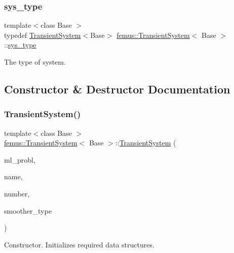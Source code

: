 \subsubsection{\texorpdfstring{sys\+\_\+type}{sys\_type}}
{\footnotesize\ttfamily template$<$class Base $>$ \\
typedef \mbox{\hyperlink{classfemus_1_1_transient_system}{Transient\+System}}$<$Base$>$ \mbox{\hyperlink{classfemus_1_1_transient_system}{femus\+::\+Transient\+System}}$<$ Base $>$\+::\mbox{\hyperlink{classfemus_1_1_transient_system_ab305e3c2b57ea9f93730f7fc712b6403}{sys\+\_\+type}}}

The type of system. 

\subsection{Constructor \& Destructor Documentation}
\mbox{\label{classfemus_1_1_transient_system_ab3db35bb6c3a8c97a88d4e8ad9461537}} 
\subsubsection{\texorpdfstring{Transient\+System()}{TransientSystem()}}
{\footnotesize\ttfamily template$<$class Base $>$ \\
\mbox{\hyperlink{classfemus_1_1_transient_system}{femus\+::\+Transient\+System}}$<$ Base $>$\+::\mbox{\hyperlink{classfemus_1_1_transient_system}{Transient\+System}} (\begin{DoxyParamCaption}\item[{\mbox{\hyperlink{classfemus_1_1_multi_level_problem}{Multi\+Level\+Problem}} \&}]{ml\+\_\+probl,  }\item[{const std\+::string \&}]{name,  }\item[{const unsigned int}]{number,  }\item[{const \mbox{\hyperlink{_mg_smoother_enum_8hpp_a4d11c2ff93e2f0f440c879a9c40cda71}{Mg\+Smoother}} \&}]{smoother\+\_\+type }\end{DoxyParamCaption})}

Constructor. Initializes required data structures. \mbox{\label{classfemus_1_1_transient_system_adb4b62a13b1445d7c0a59a73786969c3}} 
